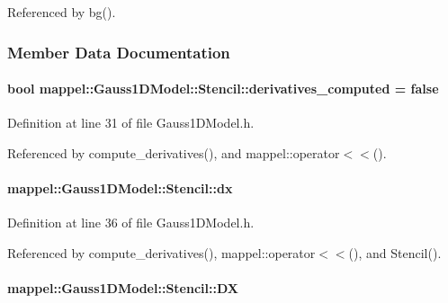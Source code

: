 Referenced by bg().



\subsubsection{Member Data Documentation}
\paragraph[{\texorpdfstring{derivatives\+\_\+computed}{derivatives_computed}}]{\setlength{\rightskip}{0pt plus 5cm}bool mappel\+::\+Gauss1\+D\+Model\+::\+Stencil\+::derivatives\+\_\+computed = false}\hypertarget{classmappel_1_1Gauss1DModel_1_1Stencil_a799e21dea3f00371748444f2ea80dba3}{}\label{classmappel_1_1Gauss1DModel_1_1Stencil_a799e21dea3f00371748444f2ea80dba3}


Definition at line 31 of file Gauss1\+D\+Model.\+h.



Referenced by compute\+\_\+derivatives(), and mappel\+::operator$<$$<$().

\paragraph[{\texorpdfstring{dx}{dx}}]{ mappel\+::\+Gauss1\+D\+Model\+::\+Stencil\+::dx}\hypertarget{classmappel_1_1Gauss1DModel_1_1Stencil_afb0de9218a5def7bf8a68eb29bfba910}{}\label{classmappel_1_1Gauss1DModel_1_1Stencil_afb0de9218a5def7bf8a68eb29bfba910}


Definition at line 36 of file Gauss1\+D\+Model.\+h.



Referenced by compute\+\_\+derivatives(), mappel\+::operator$<$$<$(), and Stencil().

\paragraph[{\texorpdfstring{DX}{DX}}]{ mappel\+::\+Gauss1\+D\+Model\+::\+Stencil\+::\+DX}\hypertarget{classmappel_1_1Gauss1DModel_1_1Stencil_a93a43ebc274ff8662990d8e71415f806}{}\label{classmappel_1_1Gauss1DModel_1_1Stencil_a93a43ebc274ff8662990d8e71415f806}


